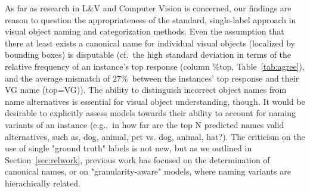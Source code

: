 As far as research in L\&V and Computer Vision is concerned, our findings are reason to question the appropriateness of the standard, single-label approach in visual object naming and categorization methods. 
Even the assumption that there at least exists a canonical name
 for individual visual objects (localized by bounding boxes) is disputable (cf.\ the high standard deviation in terms of the relative frequency of an instance's top response (column \%top, Table~\ref{tab:agree}), and the average mismatch of $27\%$~between the instances' top response and their VG name (\mbox{top=VG})).
%
The ability to distinguish incorrect object names from name alternatives is essential for visual object understanding, though. 
It would be desirable to explicitly assess models towards their ability to account for naming variants of an instance (e.g.,~in how far are the top N predicted names valid alternatives, such as, dog, animal, pet vs. dog, animal, hat?). 
%
The criticism on the use of single "ground truth" labels is not new, but %
as we outlined in Section\ \ref{sec:relwork}, previous work has focused on the determination of canonical names, or on "granularity-aware" models, where naming variants are hierachically related. 
%
